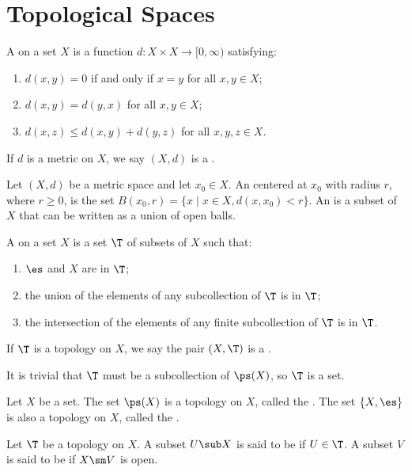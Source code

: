\documentclass[10pt]{article}
\begin{document}
\section{Topological Spaces}
\begin{definition}
    A  on a set $X$ is a function $d:X\times X\to[0,\infty)$ satisfying:
    \begin{enumerate}
        \item $d(x,y)=0$ if and only if $x=y$ for all $x,y\in X$;
        \item $d(x,y)=d(y,x)$ for all $x,y\in X$;
        \item $d(x,z)\le d(x,y)+d(y,z)$ for all $x,y,z\in X$.
    \end{enumerate}
    If $d$ is a metric on $X$, we say $(X,d)$ is a .
\end{definition}
\begin{definition}
    Let $(X,d)$ be a metric space and let ${x}_{0}\in X$. An  centered at ${x}_{0}$ with radius $r$, where $r\ge 0$, is the set $B({x}_{0},r)=\{x\mid x\in X,d(x,{x}_{0})<r\}$. An  is a subset of $X$ that can be written as a union of open balls.
\end{definition}
\begin{definition}
    A  on a set $X$ is a set $\T$ of subsets of $X$ such that:
    \begin{enumerate}
        \item $\es$ and $X$ are in $\T$;
        \item the union of the elements of any subcollection of $\T$ is in $\T$;
        \item the intersection of the elements of any finite subcollection of $\T$ is in $\T$.
    \end{enumerate}
    If $\T$ is a topology on $X$, we say the pair $(X,\T)$ is a .
\end{definition}
\par
It is trivial that $\T$ must be a subcollection of $\ps(X)$, so $\T$ is a set.
\begin{example}
    Let $X$ be a set. The set $\ps(X)$ is a topology on $X$, called the . The set $\{X,\es\}$ is also a topology on $X$, called the .
\end{example}
\begin{definition}
    Let $\T$ be a topology on $X$. A subset $U\sub X$ is said to be  if $U\in\T$. A subset $V$ is said to be  if $X\sm V$ is open.
\end{definition}
\end{document}
